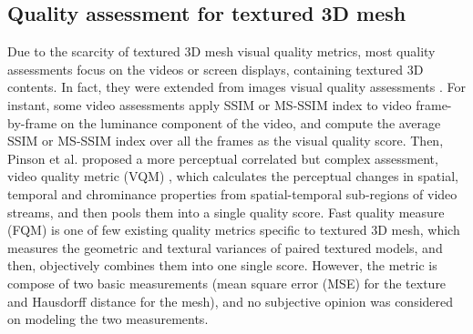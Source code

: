 \subsection{Quality assessment for textured 3D mesh}
Due to the scarcity of textured 3D mesh visual quality metrics, most quality assessments focus on the videos or screen displays, containing textured 3D contents. In fact, they were extended from images visual quality assessments \cite{Seshadrinathan_2010}. For instant, some video assessments \cite{Zhou_Wang} apply SSIM or MS-SSIM index to video frame-by-frame on the luminance component of the video, and compute the average SSIM or MS-SSIM index over all the frames as the visual quality score. Then, Pinson et al. \cite{Pinson_2004} proposed a more perceptual correlated but complex assessment, video quality metric (VQM) , which calculates the perceptual changes in spatial, temporal and chrominance properties from spatial-temporal sub-regions of video streams, and then pools them into a single quality score.  Fast quality measure (FQM) \cite{Tian_2004} is one of few existing quality metrics specific to textured 3D mesh, which measures the geometric and textural variances of paired textured models, and then, objectively combines them into one single score. However, the metric is compose of two basic measurements (mean square error (MSE) for the texture and Hausdorff distance for the mesh), and no subjective opinion was considered on modeling the two measurements.
